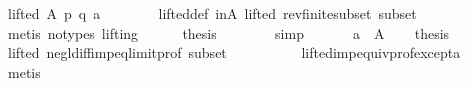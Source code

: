 \begin{isabellebody}
\ {\isachardoublequoteopen}lifted\ A\ {\isacharquery}{\kern0pt}p\ {\isacharquery}{\kern0pt}q\ a{\isachardoublequoteclose}\isanewline
\ \ \ \ \ \ \isamarkupfalse%
\ lifted{\isacharunderscore}{\kern0pt}def\ inA\ lifted\ rev{\isacharunderscore}{\kern0pt}finite{\isacharunderscore}{\kern0pt}subset\ subset\isanewline
\ \ \ \ \ \ \isamarkupfalse%
\ {\isacharparenleft}{\kern0pt}metis\ {\isacharparenleft}{\kern0pt}no{\isacharunderscore}{\kern0pt}types{\isacharcomma}{\kern0pt}\ lifting{\isacharparenright}{\kern0pt}{\isacharparenright}{\kern0pt}\isanewline
\ \ \ \ \isamarkupfalse%
\ {\isacharquery}{\kern0pt}thesis\isanewline
\ \ \ \ \ \ \isamarkupfalse%
\ simp\isanewline
\ \ \isamarkupfalse%
\isanewline
{}\isamarkupfalse%
\isanewline
\ \ \isamarkupfalse%
\ {\isachardoublequoteopen}a\ {\isasymnotin}\ A{\isachardoublequoteclose}\isanewline
\ \ \isamarkupfalse%
\ {\isacharquery}{\kern0pt}thesis\isanewline
\ \ \ \ \isamarkupfalse%
\ lifted\ negl{\isacharunderscore}{\kern0pt}diff{\isacharunderscore}{\kern0pt}imp{\isacharunderscore}{\kern0pt}eq{\isacharunderscore}{\kern0pt}limit{\isacharunderscore}{\kern0pt}prof\ subset\isanewline
\ \ \ \ \ \ \ \ \ \ lifted{\isacharunderscore}{\kern0pt}imp{\isacharunderscore}{\kern0pt}equiv{\isacharunderscore}{\kern0pt}prof{\isacharunderscore}{\kern0pt}except{\isacharunderscore}{\kern0pt}a\isanewline
\ \ \ \ \isamarkupfalse%
\ metis\isanewline
{}\isamarkupfalse%
%
\endisatagproof
{\isafoldproof}%
%
\isadelimproof
\isanewline
%
\endisadelimproof
%
\isadelimtheory
\isanewline
%
\endisadelimtheory
%
\isatagtheory
{}\isamarkupfalse%
%
\endisatagtheory
{\isafoldtheory}%
%
\isadelimtheory
%
\endisadelimtheory
%
\end{isabellebody}%
\endinput
